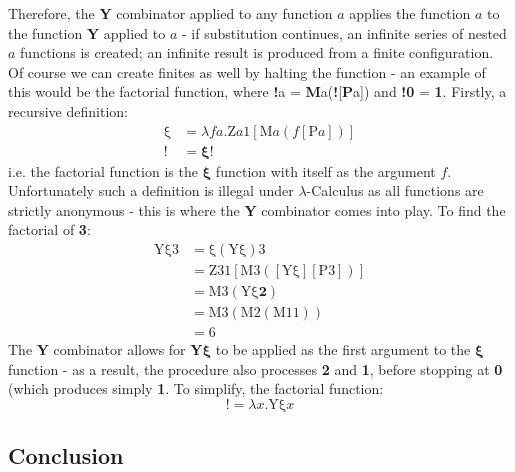 \documentclass[Master.tex]{subfiles}
\begin{document}
Therefore, the \textbf{Y} combinator applied to any function $a$ applies the function $a$ to the function \textbf{Y} applied to $a$ - if substitution continues, an infinite series of nested $a$ functions is created; an infinite result is produced from a finite configuration. Of course we can create finites as well by halting the function - an example of this would be the factorial function, where \textbf{!}a = \textbf{M}a(\textbf{!}[\textbf{P}a]) and \textbf{!0} = \textbf{1}. Firstly, a recursive definition:
\begin{equation*}
\begin{aligned}
\bm{\mathrm{\xi}} &= \lambda fa.\bm{\mathrm{Z}}a\bm{\mathrm{1}}[\bm{\mathrm{M}}a(f[\bm{\mathrm{P}}a])]\\
\bm{!} &= \bm{\xi}!
\end{aligned}
\end{equation*}
i.e. the factorial function is the $\bm{\xi}$ function with itself as the argument $f$. Unfortunately such a definition is illegal under $\lambda$-Calculus as all functions are strictly anonymous - this is where the \textbf{Y} combinator comes into play. To find the factorial of \textbf{3}:
\begin{equation*}
\begin{aligned}
\bm{\mathrm{Y\xi 3}} &= \bm{\mathrm{\xi}}(\bm{\mathrm{Y\xi}})\bm{\mathrm{3}}\\
&= \bm{\mathrm{Z31}}[\bm{\mathrm{M3}}([\bm{\mathrm{Y\xi}}][\bm{\mathrm{P3}}])]\\
&= \bm{\mathrm{M3}}(\bm{\mathrm{Y\xi}}\bm{2})\\
&= \bm{\mathrm{M3}}(\bm{\mathrm{M2}}(\bm{\mathrm{M11}}))\\
&= \bm{\mathrm{6}}
\end{aligned}
\end{equation*}
The \textbf{Y} combinator allows for \textbf{Y}$\bm{\xi}$ to be applied as the first argument to the $\bm{\xi}$ function - as a result, the procedure also processes \textbf{2} and \textbf{1}, before stopping at \textbf{0} (which produces simply \textbf{1}. To simplify, the factorial function:
\begin{equation*}
\bm{!} = \lambda x.\bm{\mathrm{Y\xi}}x
\end{equation*}
\subsection{Conclusion}
\end{document}
